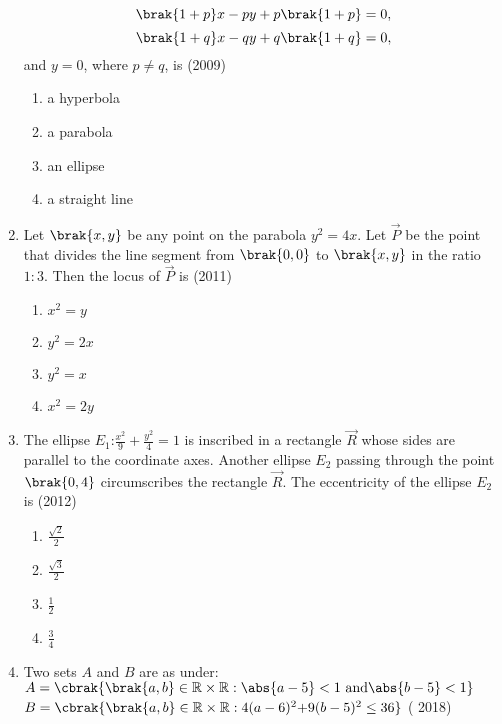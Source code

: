 \begin{enumerate}
			$$\brak{1+p}x-py+p\brak{1+p}=0,$$
			$$\brak{1+q}x-qy+q\brak{1+q}=0,$$
		and $y=0$, where $p \neq q$, is
		\hfill(2009)
		\begin{multicols}{4}
\begin{enumerate}
	\item a hyperbola
	\item a parabola
	\item an ellipse
	\item a straight line
\end{enumerate}\end{multicols}
%
	\item Let $\brak{x,y}$ be any point on the parabola $y^2=4x$. Let $\vec{P}$ be the point that divides the line segment from $\brak{0,0}$ to $\brak{x,y}$ in the ratio $1:3$. Then the locus of $\vec{P}$ is  \hfill(2011)
		\begin{multicols}{4}
		\begin{enumerate}
			\item $x^2=y$
			\item $y^2=2x$
				\columnbreak
			\item $y^2=x$
			\item $x^2=2y$
		\end{enumerate}\end{multicols}
%
	\item The ellipse $E_{1}$:$\frac{x^2}{9}+\frac{y^2}{4}=1$ is inscribed in a rectangle $\vec{R}$ whose sides are parallel to the coordinate axes. Another ellipse $E_{2}$ passing through the point $\brak{0,4}$ circumscribes the rectangle $\vec{R}$. The eccentricity of the ellipse $E_{2}$ is \hfill(2012)
%
		\begin{multicols}{4}
		\begin{enumerate}
			\item $\frac{\sqrt{2}}{2}$
			\item $\frac{\sqrt{3}}{2}$
				\columnbreak
			\item $\frac{1}{2}$
			\item $\frac{3}{4}$
		\end{enumerate}\end{multicols}
%
\item  Two sets $A$ and $B$ are as under:
$A=\cbrak{\brak{a,b}\in\mathbb{R}\times\mathbb{R}:\abs{a-5}<1\text{ and} \abs{b-5}<1}$
$B=\cbrak{\brak{a,b}\in\mathbb{R}\times\mathbb{R}:4(a-6)^2\text{+}9(b-5)^2\leq36}$
    \hfill{( 2018)}
			\begin{multicols}{2}
	\begin{enumerate}

\end{enumerate}
\end{multicols}
\end{enumerate}
